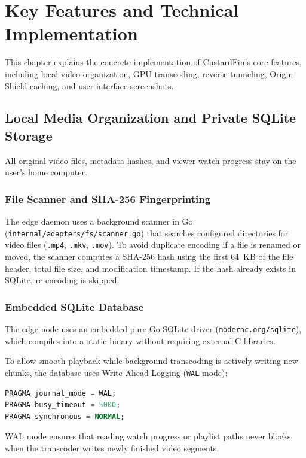 
\chapter{Key Features and Technical Implementation}
\label{chap:features_implementation}

This chapter explains the concrete implementation of CustardFin's core features, including local video organization, GPU transcoding, reverse tunneling, Origin Shield caching, and user interface screenshots.

\section{Local Media Organization and Private SQLite Storage}
\label{sec:feat_storage}

All original video files, metadata hashes, and viewer watch progress stay on the user's home computer.

\subsection{File Scanner and SHA-256 Fingerprinting}
The edge daemon uses a background scanner in Go (\texttt{internal/adapters/fs/scanner.go}) that searches configured directories for video files (\texttt{.mp4}, \texttt{.mkv}, \texttt{.mov}). To avoid duplicate encoding if a file is renamed or moved, the scanner computes a SHA-256 hash using the first 64~KB of the file header, total file size, and modification timestamp. If the hash already exists in SQLite, re-encoding is skipped.

\subsection{Embedded SQLite Database}
The edge node uses an embedded pure-Go SQLite driver (\texttt{modernc.org/sqlite}), which compiles into a static binary without requiring external C libraries. 

To allow smooth playback while background transcoding is actively writing new chunks, the database uses Write-Ahead Logging (\texttt{WAL} mode):
\begin{lstlisting}[language=sql,caption={SQLite Performance Configuration}]
PRAGMA journal_mode = WAL;
PRAGMA busy_timeout = 5000;
PRAGMA synchronous = NORMAL;
\end{lstlisting}
WAL mode ensures that reading watch progress or playlist paths never blocks when the transcoder writes newly finished video segments.

